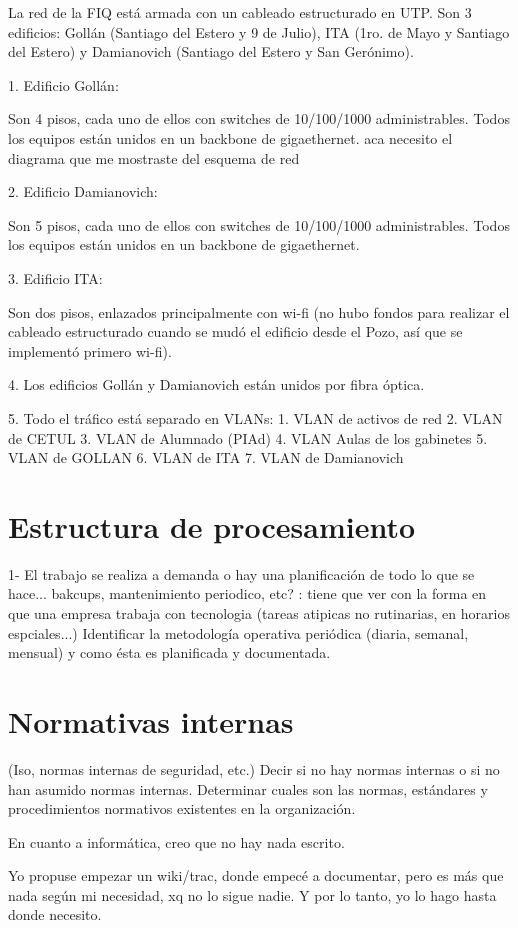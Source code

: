 \documentclass[10pt,a4paper,final]{article}
\begin{document}
La red de la FIQ está armada con un cableado estructurado en UTP. Son 3 edificios: Gollán (Santiago del Estero y 9 de Julio), ITA (1ro. de Mayo y Santiago del Estero) y Damianovich (Santiago del Estero y San Gerónimo).

1. Edificio Gollán:

  Son 4 pisos, cada uno de ellos con switches de 10/100/1000 administrables. Todos los equipos están unidos en un backbone de gigaethernet.
aca necesito el diagrama que me mostraste del esquema de red

2. Edificio Damianovich: 

  Son 5 pisos, cada uno de ellos con switches de 10/100/1000 administrables. Todos los equipos están unidos en un backbone de gigaethernet. 

3. Edificio ITA: 

  Son dos pisos, enlazados principalmente con wi-fi (no hubo fondos para realizar el cableado estructurado cuando se mudó el edificio desde el Pozo, así que se implementó primero wi-fi).

4. Los edificios Gollán y Damianovich están unidos por fibra óptica.

5. Todo el tráfico está separado en VLANs: 
  1. VLAN de activos de red
  2. VLAN de CETUL
  3. VLAN de Alumnado (PIAd)
  4. VLAN Aulas de los gabinetes
  5. VLAN de GOLLAN
  6. VLAN de ITA
  7. VLAN de Damianovich
\section{Estructura de procesamiento}
1- El trabajo se realiza a demanda o hay una planificación de todo lo que se hace... bakcups, mantenimiento periodico, etc?
: tiene que ver con la forma en que una empresa trabaja con tecnologia (tareas atipicas no rutinarias, en horarios espciales...)
Identificar la metodología operativa periódica (diaria, semanal, mensual) y como ésta es planificada y documentada.

\section{Normativas internas}
 (Iso, normas internas de seguridad, etc.) Decir si no hay normas internas o si no han asumido normas internas.
 Determinar cuales son las normas, estándares y procedimientos normativos existentes en la organización.

En cuanto a informática, creo que no hay nada escrito.

Yo propuse empezar un wiki/trac, donde empecé a documentar, pero es más que nada según mi necesidad, xq no lo sigue nadie. Y por lo tanto, yo lo hago hasta donde necesito. 
\end{document}
